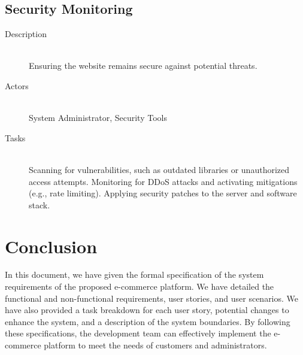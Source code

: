 \documentclass[twoside,a4paper,journal]{IEEEtran}
\begin{document}
\subsection{Security Monitoring}
\begin{description}
  \item[Description] \hfill \\
    Ensuring the website remains secure against potential threats.
  \item[Actors] \hfill \\
    System Administrator, Security Tools
  \item[Tasks] \hfill \\
    Scanning for vulnerabilities, such as outdated libraries or unauthorized
    access attempts.
    Monitoring for DDoS attacks and activating mitigations
    (e.g., rate limiting).
    Applying security patches to the server and software stack.
\end{description}


\section{Conclusion}
In this document, we have given the formal specification of the system
requirements of the proposed e-commerce platform.
We have detailed the functional and non-functional requirements, user stories,
and user scenarios.
We have also provided a task breakdown for each user story, potential changes
to enhance the system, and a description of the system boundaries.
By following these specifications, the development team can effectively
implement the e-commerce platform to meet the needs of customers and
administrators.


%
\end{document}
